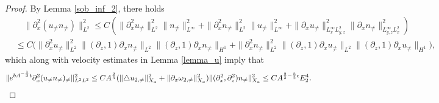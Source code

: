 \documentclass[12pt, reqno]{amsart}
\numberwithin{equation}{section}
\begin{document}
\begin{proof}
		 By Lemma \ref{sob_inf_2},  there holds
		\begin{equation*}
			\begin{aligned}
				&\quad\|\partial_x^2(u_{\neq}n_{\neq})\|^2_{L^2}
				\leq C(\|\partial_x^2u_{\neq}\|^2_{L^2}
				\|n_{\neq}\|^2_{L^{\infty}}
				+\|\partial_x^2n_{\neq}\|^2_{L^2}\|u_{\neq}\|^2_{L^{\infty}}
				+\|\partial_xu_{\neq}\|^2_{L^{\infty}_xL^2_{y,z}}
				\|\partial_xn_{\neq}\|^2_{L^{\infty}_{y,z}L^2_{x}})\\
				&\leq C\big(\|\partial_x^2u_{\neq}\|^2_{L^2}
				\|(\partial_z,1)\partial_xn_{\neq}\|_{L^2}
				\|(\partial_z,1)\partial_xn_{\neq}\|_{H^1}
				+\|\partial_x^2n_{\neq}\|^2_{L^2}
				\|(\partial_z,1)\partial_xu_{\neq}\|_{L^2}
				\|(\partial_z,1)\partial_xu_{\neq}\|_{H^1}\big),
			\end{aligned}
		\end{equation*}
		which along with velocity estimates in Lemma \ref{lemma_u} imply that 
		\begin{equation}\label{un_1}
			\begin{aligned}
				{\|{\rm e}^{bA^{-\frac{1}{3}}t}
					\partial_x^2(u_{\neq}n_{\neq})_{\neq}\|^2_{L^2L^2}}
				\leq {CA^{\frac23}(\|\triangle u_{2,\neq}\|^2_{X_a}+\|\partial_x \omega_{2,\neq}\|^2_{X_a})\|(\partial_x^2,\partial_z^2)n_{\neq}\|^2_{X_a}}\leq {CA^{\frac23-\frac{3}{2}\epsilon}E_2^4}.
			\end{aligned}
		\end{equation}
		

\end{proof}
\end{document}
